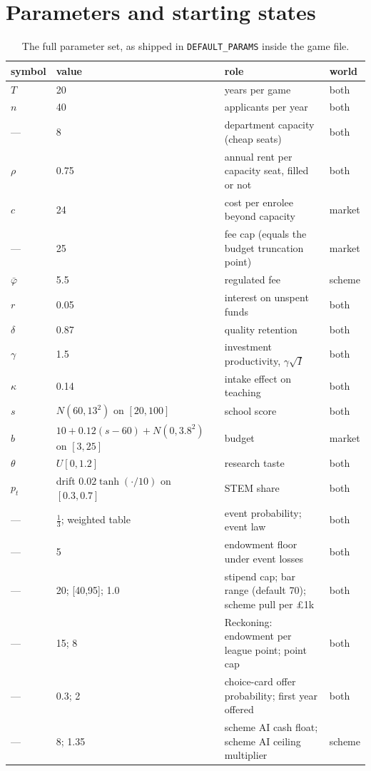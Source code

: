 \documentclass[11pt,a4paper]{article}
\begin{document}
\appendix

\section{Parameters and starting states}\label{app:params}

\begin{table}[h]
\centering\small
\begin{tabular}{llll}
\toprule
symbol & value & role & world \\
\midrule
$T$ & 20 & years per game & both \\
$n$ & 40 & applicants per year & both \\
--- & 8 & department capacity (cheap seats) & both \\
$\rho$ & 0.75 & annual rent per capacity seat, filled or not & both \\
$c$ & 24 & cost per enrolee beyond capacity & market \\
--- & 25 & fee cap (equals the budget truncation point) & market \\
$\bar\varphi$ & 5.5 & regulated fee & scheme \\
$r$ & 0.05 & interest on unspent funds & both \\
$\delta$ & 0.87 & quality retention & both \\
$\gamma$ & 1.5 & investment productivity, $\gamma\sqrt{I}$ & both \\
$\kappa$ & 0.14 & intake effect on teaching & both \\
$s$ & $N(60,13^2)$ on $[20,100]$ & school score & both \\
$b$ & $10 + 0.12(s{-}60) + N(0,3.8^2)$ on $[3,25]$ & budget & market \\
$\theta$ & $U[0,1.2]$ & research taste & both \\
$p_t$ & drift $0.02\tanh(\cdot/10)$ on $[0.3,0.7]$ & STEM share & both \\
--- & $\tfrac13$; weighted table & event probability; event law & both \\
--- & 5 & endowment floor under event losses & both \\
--- & 20; [40,95]; 1.0 & stipend cap; bar range (default 70); scheme pull per \pounds1k & both \\
--- & 15; 8 & Reckoning: endowment per league point; point cap & both \\
--- & 0.3; 2 & choice-card offer probability; first year offered & both \\
--- & 8; 1.35 & scheme AI cash float; scheme AI ceiling multiplier & scheme \\
\bottomrule
\end{tabular}
\caption{The full parameter set, as shipped in \texttt{DEFAULT\_PARAMS} inside the game file.}
\end{table}
\end{document}
